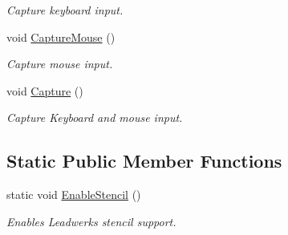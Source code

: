 \begin{DoxyCompactItemize}
\begin{DoxyCompactList}\small\item\em Capture keyboard input. \end{DoxyCompactList}\item 
\hypertarget{class_u_i_system_a9139946c67db84d93b4a23a42a51eea1}{void \hyperlink{class_u_i_system_a9139946c67db84d93b4a23a42a51eea1}{Capture\-Mouse} ()}\label{class_u_i_system_a9139946c67db84d93b4a23a42a51eea1}

\begin{DoxyCompactList}\small\item\em Capture mouse input. \end{DoxyCompactList}\item 
\hypertarget{class_u_i_system_a29ac5727af1a979e24f4e8a92ff7a5a3}{void \hyperlink{class_u_i_system_a29ac5727af1a979e24f4e8a92ff7a5a3}{Capture} ()}\label{class_u_i_system_a29ac5727af1a979e24f4e8a92ff7a5a3}

\begin{DoxyCompactList}\small\item\em Capture Keyboard and mouse input. \end{DoxyCompactList}\end{DoxyCompactItemize}
\subsection*{Static Public Member Functions}
\begin{DoxyCompactItemize}
\item 
static void \hyperlink{class_u_i_system_ac99ba6fff41b063161c3aaad85e6e1f4}{Enable\-Stencil} ()
\begin{DoxyCompactList}\small\item\em Enables Leadwerks stencil support. \end{DoxyCompactList}\end{DoxyCompactItemize}
